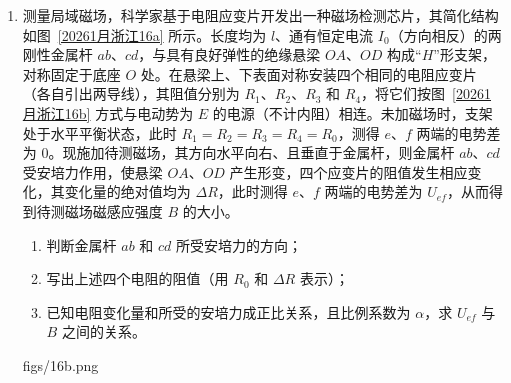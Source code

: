 \documentclass[\gkver]{gaokaozhenti}
\begin{document}
\begin{enumerate}
{\begin{enumerate}
	\item
	$420\Ucmc$

	\item
	$2.05\UJ$

\end{enumerate}
}

\item
测量局域磁场，科学家基于电阻应变片开发出一种磁场检测芯片，其简化结构如图~\ref{20261月浙江16a} 所示。长度均为 $l$、通有恒定电流 $I_{0}$（方向相反）的两刚性金属杆 $ab$、$cd$，与具有良好弹性的绝缘悬梁 $OA$、$OD$ 构成“$H$”形支架，对称固定于底座 $O$ 处。在悬梁上、下表面对称安装四个相同的电阻应变片（各自引出两导线），其阻值分别为 $R_{1}$、$R_{2}$、$R_{3}$ 和 $R_{4}$，将它们按图~\ref{20261月浙江16b} 方式与电动势为 $E$ 的电源（不计内阻）相连。未加磁场时，支架处于水平平衡状态，此时 $R_{1} = R_{2} = R_{3} = R_{4} = R_{0}$，测得 $e$、$f$ 两端的电势差为 0。现施加待测磁场，其方向水平向右、且垂直于金属杆，则金属杆 $ab$、$cd$ 受安培力作用，使悬梁 $OA$、$OD$ 产生形变，四个应变片的阻值发生相应变化，其变化量的绝对值均为 $\Delta R$，此时测得 $e$、$f$ 两端的电势差为 $U_{ef}$，从而得到待测磁场磁感应强度 $B$ 的大小。
\begin{enumerate}
	\item
	判断金属杆 $ab$ 和 $cd$ 所受安培力的方向；
	\item
	写出上述四个电阻的阻值（用 $R_{0}$ 和 $\Delta R$ 表示）；
	\item
	已知电阻变化量和所受的安培力成正比关系，且比例系数为 $\alpha$，求 $U_{ef}$ 与 $B$ 之间的关系。
\end{enumerate}
{figs/16b.png}
\end{enumerate}
\end{document}
